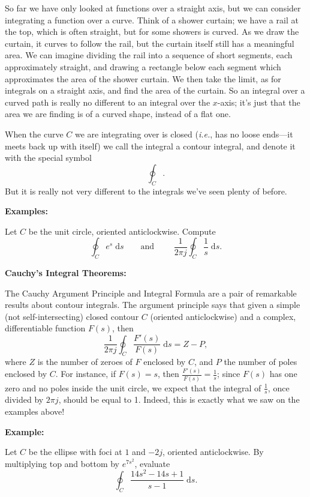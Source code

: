 \documentclass{article}
\newcommand{\diff}{\;\mathrm{d}}
\begin{document}
So far we have only looked at functions over a straight axis, but we can consider integrating a function over a curve. Think of a shower curtain; we have a rail at the top, which is often straight, but for some showers is curved. As we draw the curtain, it curves to follow the rail, but the curtain itself still has a meaningful area. We can imagine dividing the rail into a sequence of short segments, each approximately straight, and drawing a rectangle below each segment which approximates the area of the shower curtain. We then take the limit, as for integrals on a straight axis, and find the area of the curtain. So an integral over a curved path is really no different to an integral over the $x$-axis; it's just that the area we are finding is of a curved shape, instead of a flat one.

When the curve $C$ we are integrating over is closed (\textit{i.e.}, has no loose ends---it meets back up with itself) we call the integral a contour integral, and denote it with the special symbol
\[\oint_C.\]
But it is really not very different to the integrals we've seen plenty of before.\bigskip


\textbf{Examples:}\medskip

Let $C$ be the unit circle, oriented anticlockwise. Compute
\[\oint_C e^s\diff s \qquad \mbox{and }\qquad\frac{1}{2\pi j}\oint_C \frac{1}{s}\diff s.\]

\clearpage




\textbf{Cauchy's Integral Theorems:}\bigskip



The Cauchy Argument Principle and Integral Formula are a pair of remarkable results about contour integrals. The argument principle says that given a simple (not self-intersecting) closed contour $C$ (oriented anticlockwise) and a complex, differentiable function $F(s)$, then
\[\frac{1}{2\pi j}\oint_C \frac{F'(s)}{F(s)}\diff s = Z-P,\]
where $Z$ is the number of zeroes of $F$ enclosed by $C$, and $P$ the number of poles enclosed by $C$. For instance, if $F(s)=s$, then $\frac{F'(s)}{F(s)}=\frac{1}{s}$; since $F(s)$ has one zero and no poles inside the unit circle, we expect that the integral of $\frac{1}{s}$, once divided by $2\pi j$, should be equal to 1. Indeed, this is exactly what we saw on the examples above!\bigskip

\textbf{Example:}\medskip

Let $C$ be the ellipse with foci at $1$ and $-2j$, oriented anticlockwise. By multiplying top and bottom by $e^{7s^2}$, evaluate
\[\oint_C \frac{14s^2-14s+1}{s-1}\diff s.\]
\end{document}
